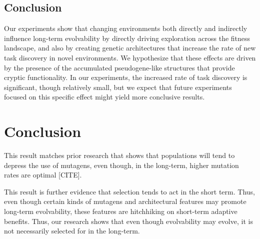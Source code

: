 \documentclass[PhD]{msu-thesis}
\begin{document}
\section{Conclusion}

Our experiments show that changing environments both directly and indirectly influence long-term evolvability by directly driving exploration across the fitness landscape, and also by creating genetic architectures that increase the rate of new task discovery in novel environments. We hypothesize that these effects are driven by the presence of the accumulated pseudogene-like structures that provide cryptic functionality. In our experiments, the increased rate of task discovery is significant, though relatively small, but we expect that future experiments focused on this specific effect might yield more conclusive results. 






\chapter{Conclusion}
\label{chap:conclusion}

This result matches prior research that shows that populations will tend to depress the use of mutagens, even though, in the long-term, higher mutation rates are optimal [CITE].  

This result is further evidence that selection tends to act in the short term. Thus, even though certain kinds of mutagens and architectural features may promote long-term evolvability, these features are hitchhiking on short-term adaptive benefits. Thus, our research shows that even though evolvability may evolve, it is not necessarily selected for in the long-term. 
\end{document}
